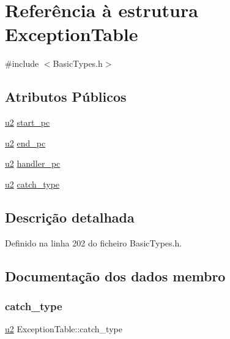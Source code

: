 \hypertarget{structExceptionTable}{}\section{Referência à estrutura Exception\+Table}
\label{structExceptionTable}


{\ttfamily \#include $<$Basic\+Types.\+h$>$}

\subsection*{Atributos Públicos}
\begin{DoxyCompactItemize}
\item 
\hyperlink{BasicTypes_8h_a732cde1300aafb73b0ea6c2558a7a54f}{u2} \hyperlink{structExceptionTable_af137b3a966825f91146039797d3b1ba5}{start\+\_\+pc}
\item 
\hyperlink{BasicTypes_8h_a732cde1300aafb73b0ea6c2558a7a54f}{u2} \hyperlink{structExceptionTable_ac2df73606ebe48af50a629f83fe9c677}{end\+\_\+pc}
\item 
\hyperlink{BasicTypes_8h_a732cde1300aafb73b0ea6c2558a7a54f}{u2} \hyperlink{structExceptionTable_a664ec4b395e02d3a5bfa6cef3493c1e7}{handler\+\_\+pc}
\item 
\hyperlink{BasicTypes_8h_a732cde1300aafb73b0ea6c2558a7a54f}{u2} \hyperlink{structExceptionTable_a440736a74baddb4197715e85ef73b836}{catch\+\_\+type}
\end{DoxyCompactItemize}


\subsection{Descrição detalhada}


Definido na linha 202 do ficheiro Basic\+Types.\+h.



\subsection{Documentação dos dados membro}
\mbox{\label{structExceptionTable_a440736a74baddb4197715e85ef73b836}} 
\subsubsection{\texorpdfstring{catch\+\_\+type}{catch\_type}}
{\footnotesize\ttfamily \hyperlink{BasicTypes_8h_a732cde1300aafb73b0ea6c2558a7a54f}{u2} Exception\+Table\+::catch\+\_\+type}



